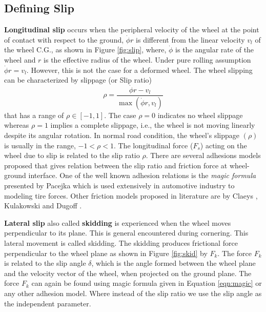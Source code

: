 \subsection{Defining Slip}
\textbf{Longitudinal slip} occurs when the peripheral velocity of the wheel at the point of contact with respect to the ground, $\dot{\phi} r$ is different from the linear velocity $v_l$ of the wheel C.G., as shown in Figure \ref{fig:slip}, where, $\dot{\phi}$ is the angular rate of the wheel and $r$ is the effective radius of the wheel. Under pure rolling assumption  $\dot{\phi}  r=v_l$. However, this is not the case for a deformed wheel. The wheel slipping can be characterized by
slippage (or Slip ratio) \[\rho = \frac{\dot{\phi}  r - v_l}{\max(\dot{\phi}  r,v_l)}\] that has a  range of $ \rho \in [-1, 1]$. The case $\rho = 0$ indicates no wheel slippage whereas $\rho = 1$ implies a complete slippage, i.e., the wheel is not moving linearly despite its angular rotation. In normal road condition, the wheel's slippage $(\rho)$is usually in the range, $-1<\rho<1 $.
 The  longitudinal force ($F_s$) acting on the wheel due to slip is related to the slip ratio $\rho$. There are several adhesions models proposed that gives relation between the slip ratio and friction force at wheel-ground interface. One of the well known adhesion relations is the \textit{ magic formula} presented by Pacejka \cite{pacejka1992magic} which is used extensively in automotive industry to modeling tire forces. Other  friction models proposed in  literature  are by Claeys \cite{claeys2001dynamic}, Kulakowski \cite{kulakowski1991mathematical}  and Dugoff \cite{dugoff1970analysis}. 
 
 \textbf{Lateral slip }also called \textbf{skidding} is experienced when the wheel moves perpendicular to its plane. This is general encountered during cornering. This lateral movement is called skidding. The skidding produces frictional force perpendicular to the wheel plane as shown in Figure \ref{fig:skid} by $F_k$. The force $F_k$ is related to the slip angle $\delta$, which is the angle formed between the wheel plane and the velocity vector of the wheel, when projected on the ground plane.
 The force $F_k$ can again be found using magic formula \cite{pacejka1992magic} given in Equation \ref{eqn:magic} or any other adhesion model. Where instead of the slip ratio we use the slip angle as the independent parameter.
 
 
